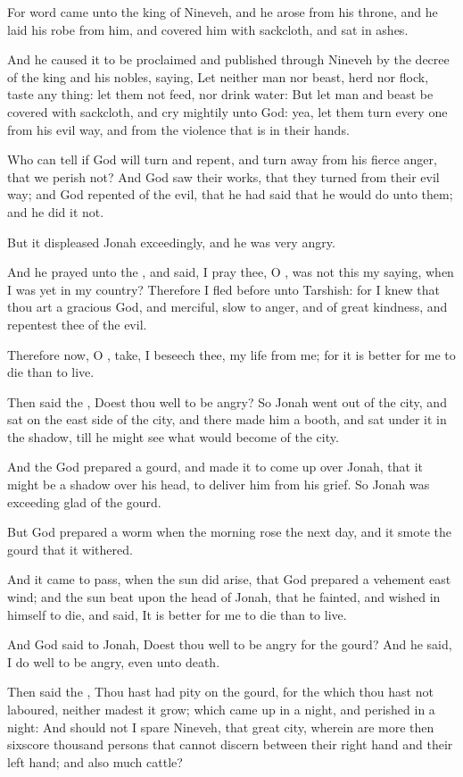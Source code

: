 \Verse For word came unto the king of Nineveh, and he arose from his throne, and he laid his robe from him, and covered him with sackcloth, and sat in ashes.

\Verse And he caused it to be proclaimed and published through Nineveh by the decree of the king and his nobles, saying, Let neither man nor beast, herd nor flock, taste any thing: let them not feed, nor drink water: \Verse But let man and beast be covered with sackcloth, and cry mightily unto God: yea, let them turn every one from his evil way, and from the violence that is in their hands.

\Verse Who can tell if God will turn and repent, and turn away from his fierce anger, that we perish not?  \Verse And God saw their works, that they turned from their evil way; and God repented of the evil, that he had said that he would do unto them; and he did it not.


\Chapter
\Verse But it displeased Jonah exceedingly, and he was very angry.

\Verse And he prayed unto the \LORD, and said, I pray thee, O \LORD, was not this my saying, when I was yet in my country? Therefore I fled before unto Tarshish: for I knew that thou art a gracious God, and merciful, slow to anger, and of great kindness, and repentest thee of the evil.

\Verse Therefore now, O \LORD, take, I beseech thee, my life from me; for it is better for me to die than to live.

\Verse Then said the \LORD, Doest thou well to be angry?  \Verse So Jonah went out of the city, and sat on the east side of the city, and there made him a booth, and sat under it in the shadow, till he might see what would become of the city.

\Verse And the \LORD God prepared a gourd, and made it to come up over Jonah, that it might be a shadow over his head, to deliver him from his grief. So Jonah was exceeding glad of the gourd.

\Verse But God prepared a worm when the morning rose the next day, and it smote the gourd that it withered.

\Verse And it came to pass, when the sun did arise, that God prepared a vehement east wind; and the sun beat upon the head of Jonah, that he fainted, and wished in himself to die, and said, It is better for me to die than to live.

\Verse And God said to Jonah, Doest thou well to be angry for the gourd?  And he said, I do well to be angry, even unto death.

\Verse Then said the \LORD, Thou hast had pity on the gourd, for the which thou hast not laboured, neither madest it grow; which came up in a night, and perished in a night: \Verse And should not I spare Nineveh, that great city, wherein are more then sixscore thousand persons that cannot discern between their right hand and their left hand; and also much cattle?

